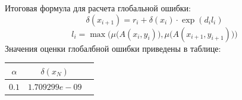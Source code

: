 \documentclass{article}
\begin{document}
Итоговая формула для расчета глобальной ошибки:
$$\delta\left(x_{i+1}\right)=r_i+\delta\left(x_i\right) \cdot \exp
\left(d_il_i\right)$$
$$l_i = \max\Big(\mu\big(A(x_i,y_i)\big),\mu\big(A(x_{i+1},y_{i+1})\big)\Big)$$
Значения оценки глобалбной ошибки приведены в таблице:
\begin{center}
  \begin{tabular}{|c|c|c|}
    \hline
    $\alpha$ & $\delta(x_N)$\\
    \hline
    $0.1$ & $1.709299e-09$\\
  \end{tabular}
\end{center}
\end{document}
